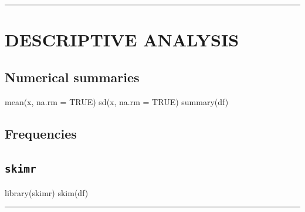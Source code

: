 \documentclass[
  english,
  8pt,
  letterpaper,
  DIV=11,
  numbers=noendperiod]{scrartcl}
\newenvironment{Shaded}{\begin{snugshade}}{\end{snugshade}}
\newcommand{\AttributeTok}[1]{\textcolor[rgb]{0.40,0.45,0.13}{#1}}
\newcommand{\ConstantTok}[1]{\textcolor[rgb]{0.56,0.35,0.01}{#1}}
\newcommand{\FunctionTok}[1]{\textcolor[rgb]{0.28,0.35,0.67}{#1}}
\newcommand{\NormalTok}[1]{\textcolor[rgb]{0.00,0.23,0.31}{#1}}
\newcommand{\SpecialCharTok}[1]{\textcolor[rgb]{0.37,0.37,0.37}{#1}}
\begin{document}
\begin{center}\rule{0.5\linewidth}{0.5pt}\end{center}

\section{ DESCRIPTIVE ANALYSIS}\label{descriptive-analysis}

\subsection{Numerical summaries}\label{numerical-summaries}

\begin{Shaded}
\begin{Highlighting}[]
\FunctionTok{mean}\NormalTok{(x, }\AttributeTok{na.rm =} \ConstantTok{TRUE}\NormalTok{)}
\FunctionTok{sd}\NormalTok{(x, }\AttributeTok{na.rm =} \ConstantTok{TRUE}\NormalTok{)}
\FunctionTok{summary}\NormalTok{(df)}
\end{Highlighting}
\end{Shaded}

\subsection{Frequencies}\label{frequencies}

\begin{Shaded}
\end{Shaded}

\subsection{\texorpdfstring{\texttt{skimr}}{skimr}}\label{skimr}

\begin{Shaded}
\begin{Highlighting}[]
\FunctionTok{library}\NormalTok{(skimr)}
\FunctionTok{skim}\NormalTok{(df)}
\end{Highlighting}
\end{Shaded}

\begin{center}\rule{0.5\linewidth}{0.5pt}\end{center}
\end{document}
